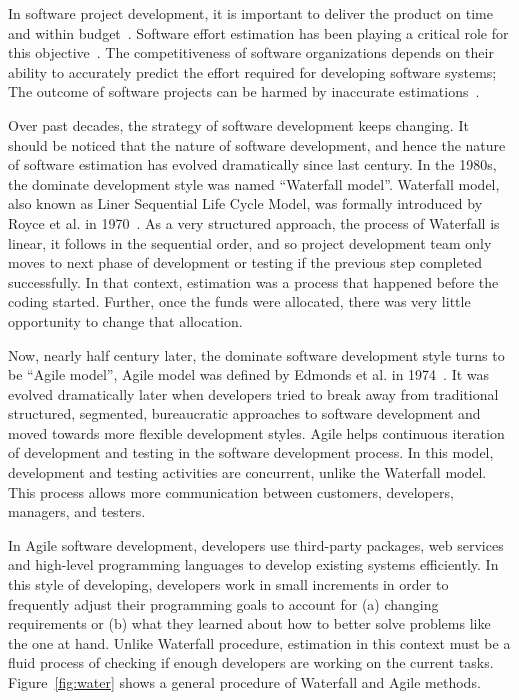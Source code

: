 \documentclass[sigconf,review,anonymous]{acmart}
\newcommand{\fig}[1]{Figure~\ref{fig:#1}}
\begin{document}
In software project development, it is important to deliver the product on time and within  budget~\cite{briand2002resource,kocaguneli2011experiences,trendowicz2014software}. Software effort estimation has been playing a critical role for this objective~\cite{sarro2016multi}. The competitiveness of software
organizations depends on their ability to accurately predict the  effort  required  for  developing  software  systems; The outcome of software projects can be harmed by inaccurate estimations~\cite{trendowicz2014software,mcconnell2006software,mendes2002further,sommerville2010software}.

Over past decades, the strategy of software development keeps changing. It should be noticed that the nature of software development, and hence the nature of software estimation has evolved dramatically since last century. In the 1980s, the dominate development style was named ``Waterfall model''. Waterfall model, also known as Liner Sequential Life Cycle Model, was formally introduced by Royce et al. in 1970~\cite{royce1970software}. As a very structured approach, the process of Waterfall is linear, it follows in the sequential order, and so project development team only moves to next phase of development or testing if the previous step completed successfully. In that context, estimation was a process that happened before the coding started. Further, once the funds were allocated, there was very little opportunity to change that allocation.


Now, nearly half century later, the dominate software development style turns to be ``Agile model'', Agile model was defined by Edmonds et al. in 1974~\cite{edmonds1974process}. It was evolved dramatically later when developers tried to break away from traditional structured, segmented, bureaucratic approaches to software development and moved towards more flexible development styles. Agile helps continuous iteration of development and testing in the software development process. In this model, development and testing activities are concurrent, unlike the Waterfall model. This process allows more communication between customers, developers, managers, and testers.

In Agile software development, developers use third-party packages, web services and high-level programming languages to develop existing systems efficiently. In this style of developing, developers work in small increments in order to frequently adjust their programming goals to account for (a) changing requirements or (b) what they learned about how to better solve problems like the one at hand. Unlike Waterfall procedure, estimation in this context must be a fluid process of checking if enough developers are working on the current tasks. \fig{water} shows a general procedure of Waterfall and Agile methods.
\end{document}
